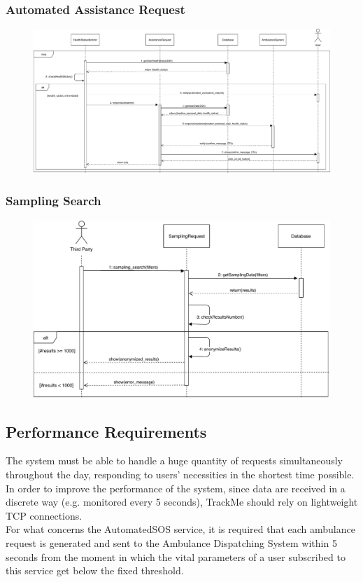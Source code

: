 \documentclass[12pt,a4paper]{article}
\begin{document}
		\subsubsection{Automated Assistance Request}
			\begin{figure}[H]
				\centering
				\includegraphics[width=1.1\linewidth]{Images/automated_request_sequence}
				\label{fig:automated_request_sequence}
			\end{figure}
		\subsubsection{Sampling Search}
			\begin{figure}[H]
				\centering
				\includegraphics[width=1.2\linewidth]{Images/sampling_request_sequence}
				\label{fig:sampling_request_sequence}
			\end{figure}

	\subsection{Performance Requirements}
	The system must be able to handle a huge quantity of requests simultaneously throughout the day, responding to users' necessities in the shortest time possible. In order to improve the performance of the system, since data are received in a discrete way (e.g. monitored every 5 seconds), TrackMe should rely on lightweight TCP connections.\\
	For what concerns the AutomatedSOS service, it is required that each ambulance request is generated and sent to the Ambulance Dispatching System within 5 seconds from the moment in which the vital parameters of a user subscribed to this service get below the fixed threshold.
\end{document}
